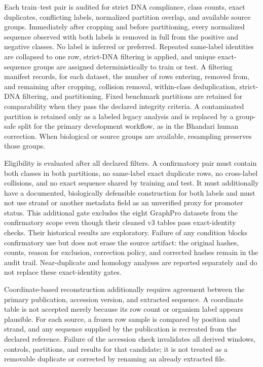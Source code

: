 Each train--test pair is audited for strict DNA compliance, class counts, exact
duplicates, conflicting labels, normalized partition overlap, and available
source groups. Immediately after cropping and before partitioning, every
normalized sequence observed with both labels is removed in full from the
positive and negative classes. No label is inferred or preferred. Repeated
same-label identities are collapsed to one row, strict-DNA filtering is applied,
and unique exact-sequence groups are assigned deterministically to train or
test. A filtering manifest records, for each dataset, the number of rows
entering, removed from, and remaining after cropping, collision removal,
within-class deduplication, strict-DNA filtering, and partitioning. Fixed
benchmark partitions are retained for comparability when
they pass the declared integrity criteria. A contaminated partition is retained
only as a labeled legacy analysis and is replaced by a group-safe split for the
primary development workflow, as in the Bhandari human correction. When
biological or source groups are available, resampling preserves those groups.

Eligibility is evaluated after all declared filters. A confirmatory pair must
contain both classes in both partitions, no same-label exact duplicate rows, no
cross-label collisions, and no exact sequence shared by training and test.
It must additionally have a documented, biologically defensible construction
for both labels and must not use strand or another metadata field as an
unverified proxy for promoter status. This additional gate excludes the eight
GraphPro datasets from the confirmatory scope even though their cleaned v3
tables pass exact-identity checks. Their historical results are exploratory.
Failure of any condition blocks confirmatory use but does not erase the source
artifact: the original hashes, counts, reason for exclusion, correction policy,
and corrected hashes remain in the audit trail. Near-duplicate and homology
analyses are reported separately and do not replace these exact-identity gates.

Coordinate-based reconstruction additionally requires agreement between the
primary publication, accession version, and extracted sequence. A coordinate
table is not accepted merely because its row count or organism label appears
plausible. For each source, a frozen row sample is compared by position and
strand, and any sequence supplied by the publication is recreated from the
declared reference. Failure of the accession check invalidates all derived
windows, controls, partitions, and results for that candidate; it is not treated
as a removable duplicate or corrected by renaming an already extracted file.

